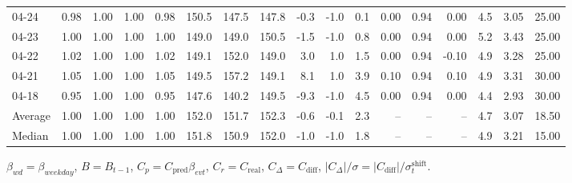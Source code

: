 \begin{threeparttable}
{\begin{tabular}{lrrrrrrrrrrrrrrrr}
  04-24 &         0.98 &           1.00 &          1.00 &          0.98 & 150.5 & 147.5 & 147.8 &       -0.3 &                     -1.0 &                 0.1 &       0.00 &      0.94 &           0.00 &              4.5 &            3.05 &                  25.00 \\
  04-23 &         1.00 &           1.00 &          1.00 &          1.00 & 149.0 & 149.0 & 150.5 &       -1.5 &                     -1.0 &                 0.8 &       0.00 &      0.94 &           0.00 &              5.2 &            3.43 &                  25.00 \\
  04-22 &         1.02 &           1.00 &          1.00 &          1.02 & 149.1 & 152.0 & 149.0 &        3.0 &                      1.0 &                 1.5 &       0.00 &      0.94 &          -0.10 &              4.9 &            3.28 &                  25.00 \\
  04-21 &         1.05 &           1.00 &          1.00 &          1.05 & 149.5 & 157.2 & 149.1 &        8.1 &                      1.0 &                 3.9 &       0.10 &      0.94 &           0.10 &              4.9 &            3.31 &                  30.00 \\
  04-18 &         0.95 &           1.00 &          1.00 &          0.95 & 147.6 & 140.2 & 149.5 &       -9.3 &                     -1.0 &                 4.5 &       0.00 &      0.94 &           0.00 &              4.4 &            2.93 &                  30.00 \\
Average &         1.00 &           1.00 &          1.00 &          1.00 & 152.0 & 151.7 & 152.3 &       -0.6 &                     -0.1 &                 2.3 &         -- &        -- &             -- &              4.7 &            3.07 &                  18.50 \\
 Median &         1.00 &           1.00 &          1.00 &          1.00 & 151.8 & 150.9 & 152.0 &       -1.0 &                     -1.0 &                 1.8 &         -- &        -- &             -- &              4.9 &            3.21 &                  15.00 \\
\bottomrule
\end{tabular}
}
\begin{tablenotes}\footnotesize
\item $\beta_{wd}=\beta_{weekday}$, $B=B_{t-1}$,
$C_p=C_{\text{pred}}\beta_{evt}$, $C_r=C_{\text{real}}$,
$C_\Delta=C_{\text{diff}}$, $|C_\Delta|/\sigma=|C_{\text{diff}}|/\sigma_t^{\text{shift}}$.
\end{tablenotes}
\end{threeparttable}
\endgroup
